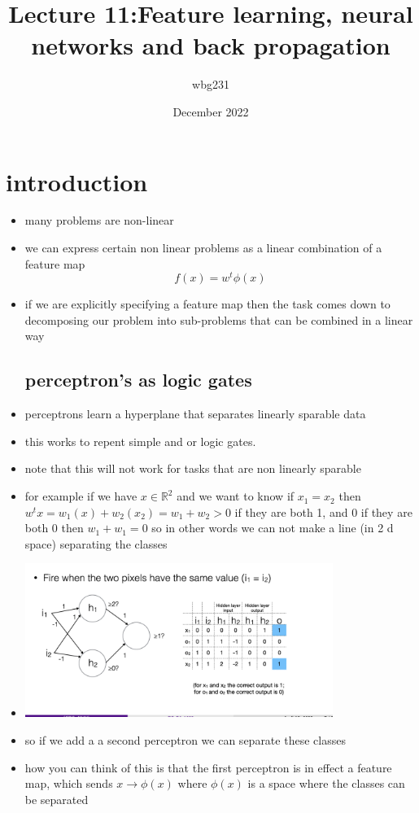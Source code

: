 \documentclass{article}
\title{Lecture 11:Feature learning, neural networks and back propagation }
\author{wbg231 }
\date{December 2022}
\begin{document}
\maketitle

\section{introduction}
\begin{itemize}
\subsection*{Feature engineering}
\item many problems are non-linear 
\item we can express certain non linear problems as a linear combination of a feature map $$f(x)=w^{t}\phi(x)$$
\item if we are explicitly specifying a feature map then the task comes down to decomposing our problem into sub-problems that can be combined in a linear way
\subsection*{perceptron's as logic gates}
\item perceptrons learn a hyperplane that separates linearly sparable data
\item this works to repent simple and or logic gates. 
\item note that this will not work for tasks that are non linearly sparable 
\item for example if we have $x\in \mathbb{R}^{2}$ and we want to know if $x_1=x_2$ then $w^{t}x=w_1(x)+w_2(x_2)=w_1+w_2>0$ if they are both 1, and 0 if they are both 0 then $w_1+w_1=0$ so in other words we can not make a line (in 2 d space) separating the classes
\item \includegraphics*[width=10cm]{images/Screenshot 2023-05-15 at 12.13.33 AM.png}
\item so if we add a a second perceptron we can separate these classes
\item how you can think of this is that the first perceptron is in effect a feature map, which sends $x\rightarrow \phi(x)$ where $\phi(x)$ is a space where the classes can be separated 

\end{itemize}
\end{document}
